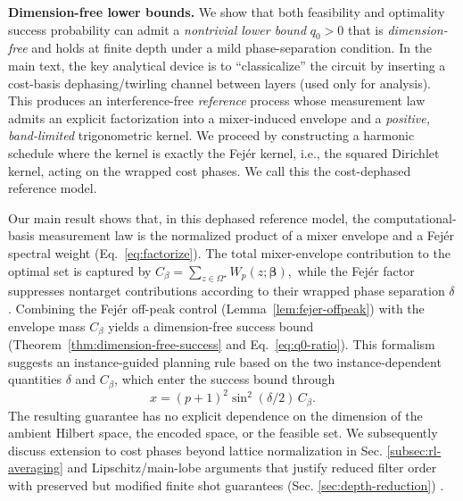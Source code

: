 \documentclass[a4paper,unpublished,onecolumn,11pt]{quantumarticle}
\theoremstyle{definition}
\theoremstyle{remark}
\begin{document}
\medskip\noindent
\textbf{Dimension-free lower bounds.}
We show that both feasibility and optimality success probability can admit  a \emph{nontrivial lower bound}
\(q_0>0\) that is \emph{dimension-free} and holds at finite depth under a mild phase-separation condition. In the main text, the key analytical device is to ``classicalize'' the circuit by inserting a
cost-basis dephasing/twirling channel between layers (used only for analysis).
This produces an interference-free \emph{reference} process whose measurement law
admits an explicit factorization into a mixer-induced envelope and a \emph{positive, band-limited} trigonometric kernel.  We proceed by constructing a  harmonic schedule  where the kernel is exactly the Fej\'er
kernel, i.e., the squared Dirichlet kernel, acting on the wrapped cost phases\cite{WeisseKPM2006,SteinShakarchi2003Fourier,Katznelson2004}. We call this the cost-dephased reference model. 




\medskip
\noindent
Our main result shows that, in this dephased reference model, the computational-basis measurement law is the normalized product of a mixer envelope and a Fej\'er spectral weight (Eq.~\ref{eq:factorize}). The total mixer-envelope contribution to the optimal set is captured by
\(
C_\beta=\sum_{z\in\Omega^\star}W_p(z;\boldsymbol\beta),
\)
while the Fej\'er factor suppresses nontarget contributions according to their wrapped phase separation $\delta$. Combining the Fej\'er off-peak control (Lemma~\ref{lem:fejer-offpeak}) with the
envelope mass \(C_\beta\) yields a dimension-free success bound (Theorem~\ref{thm:dimension-free-success} and Eq.~\ref{eq:q0-ratio}). This formalism suggests an instance-guided planning rule based on the two instance-dependent quantities $\delta$ and $C_\beta$, which enter the success bound through
\[
x=(p+1)^2\sin^2(\delta/2)\,C_\beta.
\]
The resulting guarantee has no explicit dependence on the dimension of the ambient Hilbert space, the encoded space, or the feasible set. We subsequently discuss extension to cost phases beyond lattice normalization in Sec. \ref{subsec:rl-averaging} and Lipschitz/main-lobe arguments that justify  reduced filter order with preserved but modified finite shot guarantees (Sec. \ref{sec:depth-reduction}) . 



\end{document}
